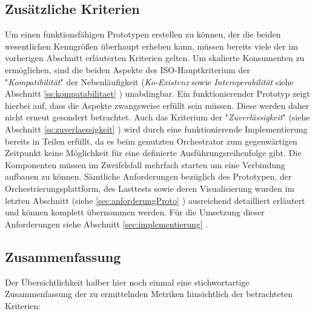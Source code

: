 \subsection{Zusätzliche Kriterien}
Um einen funktionsfähigen Prototypen erstellen zu können, der die beiden wesentlichen Kenngrößen überhaupt erheben kann, müssen bereits viele der im vorherigen Abschnitt erläuterten Kriterien gelten. Um skalierte Konsumenten zu ermöglichen, sind die beiden Aspekte des ISO-Hauptkriterium der "\emph{Kompatibilität}" der Nebenläufigkeit (\emph{Ko-Existenz} sowie \emph{Interoperabilität} siehe Abschnitt \ref{ss:kompatabilitaet} ) unabdingbar. Ein funktionierender Prototyp zeigt hierbei auf, dass die Aspekte zwangsweise erfüllt sein müssen. Diese werden daher nicht erneut gesondert betrachtet. Auch das Kriterium der "\emph{Zuverlässigkeit}" (siehe Abschnitt \ref{ss:zuverlaessigkeit} ) wird durch eine funktionierende Implementierung bereits in Teilen erfüllt, da es beim genutzten Orchestrator zum gegenwärtigen Zeitpunkt keine Möglichkeit für eine definierte Ausführungsreihenfolge gibt. Die Komponenten müssen im Zweifelsfall mehrfach starten um eine Verbindung aufbauen zu können. Sämtliche Anforderungen bezüglich des Prototypen, der Orchestrierungsplattform, des Lasttests sowie deren Visualisierung wurden im letzten Abschnitt (siehe \ref{sec:anforderungProto} ) ausreichend detailliert erläutert und können komplett übernommen werden. Für die Umsetzung dieser Anforderungen siehe Abschnitt \ref{sec:implementierung} .

\subsection{Zusammenfassung}
Der Übersichtlichkeit halber hier noch einmal eine stichwortartige Zusammenfassung der zu ermittelnden Metriken hinsichtlich der betrachteten Kriterien:

